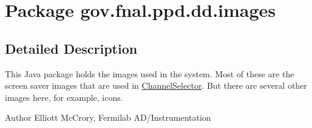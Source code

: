 \hypertarget{namespacegov_1_1fnal_1_1ppd_1_1dd_1_1images}{\section{Package gov.\-fnal.\-ppd.\-dd.\-images}
\label{namespacegov_1_1fnal_1_1ppd_1_1dd_1_1images}
}


\subsection{Detailed Description}
This Java package holds the images used in the system. Most of these are the screen saver images that are used in \hyperlink{classgov_1_1fnal_1_1ppd_1_1dd_1_1ChannelSelector}{Channel\-Selector}. But there are several other images here, for example, icons.

\begin{DoxyAuthor}{Author}
Elliott Mc\-Crory, Fermilab A\-D/\-Instrumentation 
\end{DoxyAuthor}
